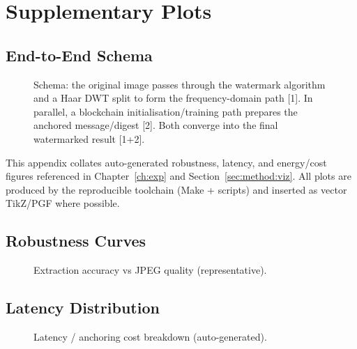 \chapter{Supplementary Plots}\label{app:plots}
\section*{End-to-End Schema}
\begin{figure}[!t]
    \centering
    \makebox[\textwidth][c]{%
        \resizebox{!}{0.50\textheight}{%
        }%
    }
    \caption{Schema: the original image passes through the watermark algorithm and a Haar DWT split to form the frequency-domain path [1]. In parallel, a blockchain initialisation/training path prepares the anchored message/digest [2]. Both converge into the final watermarked result [1+2].}
    \label{fig:end_to_end_schema}
\end{figure}

This appendix collates auto-generated robustness, latency, and energy/cost
figures referenced in Chapter~\ref{ch:exp} and Section~\ref{sec:method:viz}.
All plots are produced by the reproducible toolchain (Make + scripts) and
inserted as vector TikZ/PGF where possible.

\section*{Robustness Curves}
\begin{figure}[ht]
  \centering
  \caption{Extraction accuracy vs JPEG quality (representative).}\label{fig:app:robustness_curve}
\end{figure}

\section*{Latency Distribution}
\begin{figure}[ht]
  \centering
  \caption{Latency / anchoring cost breakdown (auto-generated).}\label{fig:app:anchoring_cost}
\end{figure}

